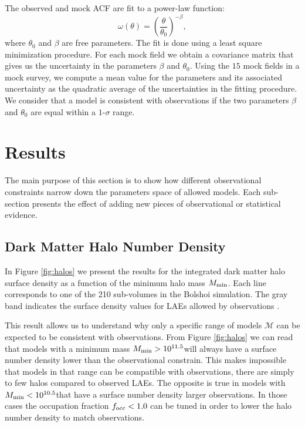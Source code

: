 \documentclass[usenatbib]{mn2e}
\newcommand{\hMsun}{{\ifmmode{h^{-1}{\rm
        {M_{\odot}}}}\else{$h^{-1}{\rm{M_{\odot}}}$}\fi}}
\begin{document}
The observed and mock ACF are fit to a power-law function:
\begin{equation}
\omega(\theta) = \left(\frac{\theta}{\theta_{0}}\right)^{-\beta}, 
\label{eq:fitting}
\end{equation}
where $\theta_0$ and $\beta$ are free parameters. The fit is done
using a least square minimization procedure. For each mock field we obtain a
covariance matrix that gives us the uncertainty in the parameters $\beta$ and
$\theta_0$. Using the $15$ mock fields in a mock survey, we compute a
mean value for the parameters and its associated uncertainty as the
quadratic average of the uncertainties in the fitting procedure. We
consider that a model is consistent with observations if the two
parameters $\beta$ and $\theta_0$ are equal within a $1$-$\sigma$
range.   



 
\section{Results}
\label{sec:results}

The main purpose of this section is to show how different
observational constraints narrow down the parameters space of allowed
models. Each sub-section presents the effect of adding new pieces of
observational or statistical evidence. 


\subsection{Dark Matter Halo Number Density}

In Figure \ref{fig:halos} we present the results for  the
integrated dark matter halo surface density as a function of the
minimum halo mass $M_{\rm min}$. Each line corresponds to one of the
210 sub-volumes in the Bolshoi simulation. The gray band indicates the
surface density values for LAEs allowed by observations
\citep{Yamada2012}. 
 
This result allows us to understand why only a specific range of
models ${\mathcal M}$ can be expected to be consistent with
observations. From Figure \ref{fig:halos} we can read that models with
a minimum mass $M_{\rm min}>10^{11.5}$\hMsun will always have a
surface number density lower than the observational constrain. This
makes impossible that models in that range can be compatible with
observations, there are simply to few halos compared to observed
LAEs. The opposite is true in models with $M_{\rm
  min}<10^{10.5}$\hMsun that have a surface number density larger
observations. In those cases the occupation fraction $f_{\rm occ}<1.0$
can be tuned in order to lower the halo number density to match
observations.  
\end{document}
